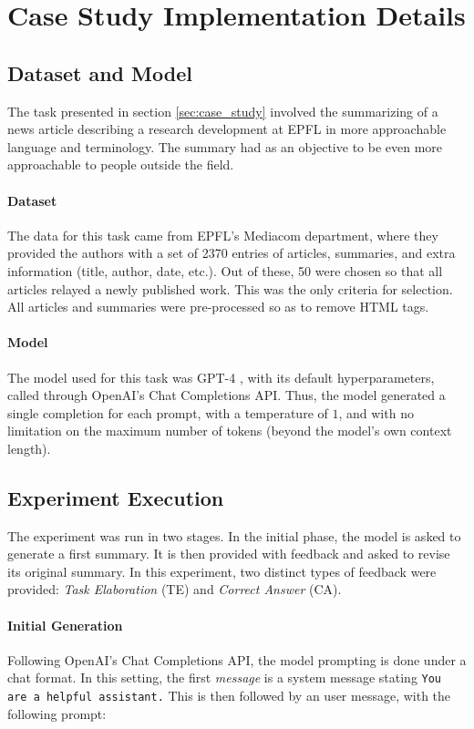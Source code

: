 \section{Case Study Implementation Details}
\label{app:case_study}

\subsection{Dataset and Model}
The task presented in section \ref{sec:case_study} involved the summarizing of a news article describing a research development at EPFL in more approachable language and terminology. The summary had as an objective to be even more approachable to people outside the field. 

\paragraph{Dataset} The data for this task came from EPFL's Mediacom department, where they provided the authors with a set of 2370 entries of articles, summaries, and extra information (title, author, date, etc.). Out of these, 50 were chosen so that all articles relayed a newly published work. This was the only criteria for selection. All articles and summaries were pre-processed so as to remove HTML tags.

\paragraph{Model} The model used for this task was GPT-4 \citep{openai2023gpt4}, with its default hyperparameters, called through OpenAI's Chat Completions API. Thus, the model generated a single completion for each prompt, with a temperature of $1$, and with no limitation on the maximum number of tokens (beyond the model's own context length).

\subsection{Experiment Execution}
The experiment was run in two stages. In the initial phase, the model is asked to generate a first summary. It is then provided with feedback and asked to revise its original summary. In this experiment, two distinct types of feedback were provided: \textit{Task Elaboration} (TE) and \textit{Correct Answer} (CA).

\paragraph{Initial Generation}
Following OpenAI's Chat Completions API, the model prompting is done under a chat format. In this setting, the first \textit{message} is a system message stating \texttt{You are a helpful assistant.} This is then followed by an user message, with the following prompt: 

